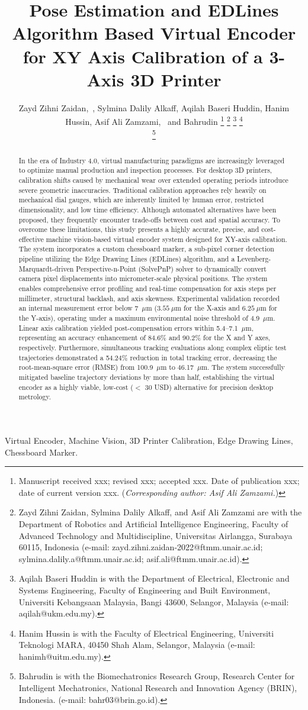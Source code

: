 \documentclass[journal]{IEEEtran}
\title{Pose Estimation and EDLines Algorithm Based Virtual Encoder for XY Axis Calibration of a 3-Axis 3D Printer}
\author{
Zayd Zihni Zaidan,~\IEEEmembership{Member,~IEEE},
Sylmina Dalily Alkaff,
Aqilah Baseri Huddin,
Hanim Hussin,
Asif Ali Zamzami,~\IEEEmembership{Member,~IEEE}
and Bahrudin
%
\thanks{Manuscript received xxx; revised xxx; accepted xxx. Date of publication xxx; date of current version xxx. (\textit{Corresponding author: Asif Ali Zamzami.})}
%
\thanks{Zayd Zihni Zaidan, Sylmina Dalily Alkaff, and Asif Ali Zamzami are with the Department of Robotics and Artificial Intelligence Engineering, Faculty of Advanced Technology and Multidiscipline, Universitas Airlangga, Surabaya 60115, Indonesia (e-mail: zayd.zihni.zaidan-2022@ftmm.unair.ac.id; sylmina.dalily.a@ftmm.unair.ac.id; asif.ali@ftmm.unair.ac.id).}
%
\thanks{Aqilah Baseri Huddin is with the Department of Electrical, Electronic and Systems Engineering, Faculty of Engineering and Built Environment, Universiti Kebangsaan Malaysia, Bangi 43600, Selangor, Malaysia (e-mail: aqilah@ukm.edu.my).}
%
\thanks{Hanim Hussin is with the Faculty of Electrical Engineering, Universiti Teknologi MARA, 40450 Shah Alam, Selangor, Malaysia (e-mail: hanimh@uitm.edu.my).}

\thanks{Bahrudin is with the Biomechatronics Research Group, Research Center for Intelligent Mechatronics, National Research and Innovation Agency (BRIN), Indonesia. (e-mail: bahr03@brin.go.id).}
}
\begin{document}
\maketitle

\begin{abstract}
In the era of Industry 4.0, virtual manufacturing paradigms are increasingly leveraged to optimize manual production and inspection processes. For desktop 3D printers, calibration shifts caused by mechanical wear over extended operating periods introduce severe geometric inaccuracies. Traditional calibration approaches rely heavily on mechanical dial gauges, which are inherently limited by human error, restricted dimensionality, and low time efficiency. Although automated alternatives have been proposed, they frequently encounter trade-offs between cost and spatial accuracy. To overcome these limitations, this study presents a highly accurate, precise, and cost-effective machine vision-based virtual encoder system designed for XY-axis calibration. The system incorporates a custom chessboard marker, a sub-pixel corner detection pipeline utilizing the Edge Drawing Lines (EDLines) algorithm, and a Levenberg-Marquardt-driven Perspective-n-Point (SolvePnP) solver to dynamically convert camera pixel displacements into micrometer-scale physical positions. The system enables comprehensive error profiling and real-time compensation for axis steps per millimeter, structural backlash, and axis skewness. Experimental validation recorded an internal measurement error below 7~$\mu$m ($3.55~\mu$m for the X-axis and $6.25~\mu$m for the Y-axis), operating under a maximum environmental noise threshold of 4.9~$\mu$m. Linear axis calibration yielded post-compensation errors within 5.4--7.1~$\mu$m, representing an accuracy enhancement of 84.6\% and 90.2\% for the X and Y axes, respectively. Furthermore, simultaneous tracking evaluations along complex eliptic test trajectories demonstrated a 54.24\% reduction in total tracking error, decreasing the root-mean-square error (RMSE) from 100.9~$\mu$m to 46.17~$\mu$m. The system successfully mitigated baseline trajectory deviations by more than half, establishing the virtual encoder as a highly viable, low-cost ($<$ 30 USD) alternative for precision desktop metrology.
\end{abstract}

\begin{IEEEkeywords}
Virtual Encoder, Machine Vision, 3D Printer Calibration, Edge Drawing Lines, Chessboard Marker.
\end{IEEEkeywords}

\IEEEpeerreviewmaketitle











\end{document}
